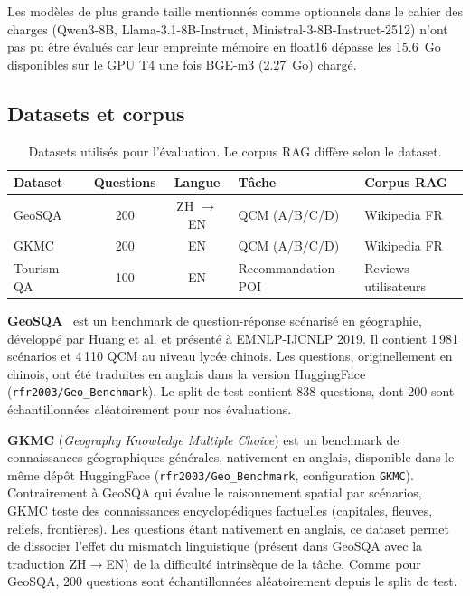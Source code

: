 \documentclass[12pt,a4paper]{article}
\begin{document}
Les mod\`eles de plus grande taille mentionn\'es comme optionnels dans le cahier des charges (Qwen3-8B, Llama-3.1-8B-Instruct, Ministral-3-8B-Instruct-2512) n'ont pas pu \^etre \'evalu\'es car leur empreinte m\'emoire en float16 d\'epasse les 15.6~Go disponibles sur le GPU T4 une fois BGE-m3 (2.27~Go) charg\'e.

\subsection{Datasets et corpus}

\begin{table}[H]
\centering
\small
\caption{Datasets utilis\'es pour l'\'evaluation. Le corpus RAG diff\`ere selon le dataset.}
\label{tab:datasets}
\begin{tabular}{@{} l c c l l @{}}
\toprule
\textbf{Dataset} & \textbf{Questions} & \textbf{Langue} & \textbf{T\^ache} & \textbf{Corpus RAG} \\
\midrule
GeoSQA~\cite{huang_geosqa_2019}
  & 200 & ZH $\to$ EN & QCM (A/B/C/D) & Wikipedia FR \\
\rowcolor{lightgray}
GKMC & 200 & EN & QCM (A/B/C/D) & Wikipedia FR \\
Tourism-QA~\cite{tourismqa2021}
  & 100 & EN & Recommandation POI & Reviews utilisateurs \\
\bottomrule
\end{tabular}
\end{table}

\textbf{GeoSQA}~\cite{huang_geosqa_2019} est un benchmark de question-r\'eponse sc\'enaris\'e en g\'eographie, d\'evelopp\'e par Huang et al. et pr\'esent\'e \`a EMNLP-IJCNLP 2019. Il contient 1\,981 sc\'enarios et 4\,110 QCM au niveau lyc\'ee chinois. Les questions, originellement en chinois, ont \'et\'e traduites en anglais dans la version HuggingFace (\texttt{rfr2003/Geo\_Benchmark}). Le split de test contient 838 questions, dont 200 sont \'echantillonn\'ees al\'eatoirement pour nos \'evaluations.

\textbf{GKMC} (\textit{Geography Knowledge Multiple Choice}) est un benchmark de connaissances g\'eographiques g\'en\'erales, nativement en anglais, disponible dans le m\^eme d\'ep\^ot HuggingFace (\texttt{rfr2003/Geo\_Benchmark}, configuration \texttt{GKMC}). Contrairement \`a GeoSQA qui \'evalue le raisonnement spatial par sc\'enarios, GKMC teste des connaissances encyclop\'ediques factuelles (capitales, fleuves, reliefs, fronti\`eres). Les questions \'etant nativement en anglais, ce dataset permet de dissocier l'effet du mismatch linguistique (pr\'esent dans GeoSQA avec la traduction ZH$\to$EN) de la difficult\'e intrins\`eque de la t\^ache. Comme pour GeoSQA, 200 questions sont \'echantillonn\'ees al\'eatoirement depuis le split de test.
\end{document}
